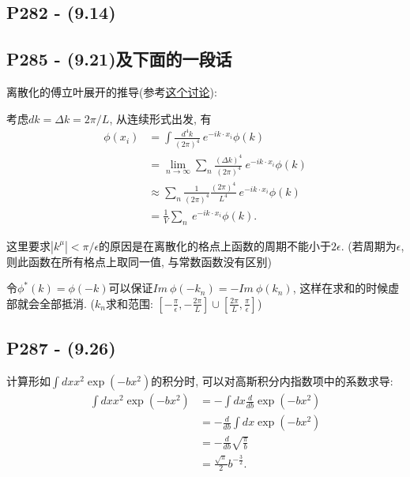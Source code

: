 \subsection{P282 - (9.14)}


\subsection{P285 - (9.21)及下面的一段话}

离散化的傅立叶展开的推导(参考\href{https://physics.stackexchange.com/questions/533991/the-discrete-fourier-series-in-peskin-and-schroeder-page-285}{这个讨论}):

考虑$dk = \Delta k = 2\pi/L$, 从连续形式出发, 有
\begin{equation}
  \begin{aligned}
    \phi(x_i) & = \int \frac{d^4 k}{(2\pi)^4} \ e^{-ik\cdot x_i}\phi(k)                                   \\
              & = \lim_{n\rightarrow\infty}\sum_n \frac{(\Delta k)^4}{(2\pi)^4} \ e^{-ik\cdot x_i}\phi(k) \\
              & \approx \sum_n \frac{1}{(2\pi)^4} \frac{(2\pi)^4}{L^4}\ e^{-ik\cdot x_i}\phi(k)           \\
              & = \frac{1}{V} \sum_n \ e^{-ik\cdot x_i}\phi(k).
  \end{aligned}
\end{equation}

这里要求$|k^{\mu}| < \pi/\epsilon$的原因是在离散化的格点上函数的周期不能小于$2\epsilon$.
(若周期为$\epsilon$, 则此函数在所有格点上取同一值, 与常数函数没有区别)

令$\phi^*(k) = \phi(-k)$可以保证$Im\ \phi(-k_n) = -Im\ \phi(k_n)$, 这样在求和的时候虚部就会全部抵消.
($k_n$求和范围: $[-\frac{\pi}{\epsilon}, -\frac{2\pi}{L}]\cup [\frac{2\pi}{L}, \frac{\pi}{\epsilon}]$)

\subsection{P287 - (9.26)}

计算形如$\int dx x^2 \exp(-bx^2)$的积分时, 可以对高斯积分内指数项中的系数求导:
\begin{equation}
  \begin{aligned}
    \int dx x^2 \exp(-bx^2) & = -\int dx \frac{d}{db}\exp(-bx^2)      \\
                            & = -\frac{d}{db} \int dx \exp(-bx^2)     \\
                            & = -\frac{d}{db} \sqrt{\frac{\pi}{b}}    \\
                            & = \frac{\sqrt{\pi}}{2}b^{-\frac{3}{2}}.
  \end{aligned}
\end{equation}

